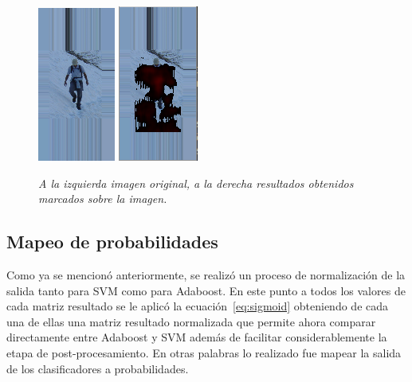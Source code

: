\begin{figure}[htc]
  \centering
  \includegraphics[scale=1]{images/imgorig}
  \includegraphics[scale=1]{images/resultadosobreimagen}
  \caption{\em A la izquierda imagen original, a la derecha resultados obtenidos marcados sobre la imagen.}  
  \label{fig:resultadoenimagen}
\end{figure}


\subsection{Mapeo de probabilidades}

Como ya se mencionó anteriormente, se realizó un proceso de normalización de la salida tanto para SVM como para Adaboost. En este punto a todos los valores de cada matriz resultado se le aplicó la ecuación~\ref{eq:sigmoid} obteniendo de cada una de ellas una matriz resultado normalizada que permite ahora comparar directamente entre Adaboost y SVM además de facilitar considerablemente la etapa de post-procesamiento. En otras palabras lo realizado fue mapear la salida de los clasificadores a probabilidades.


